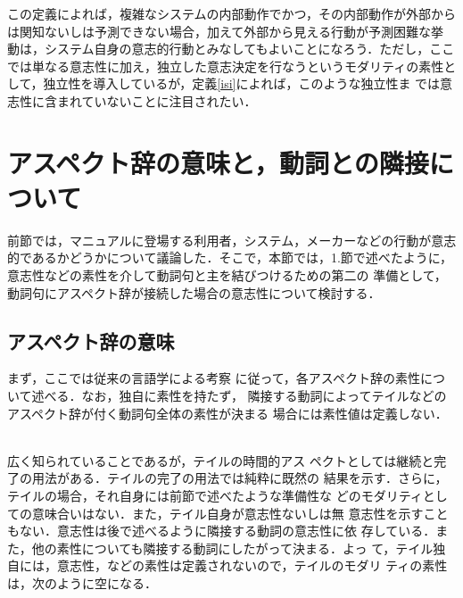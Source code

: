 この定義によれば，複雑なシステムの内部動作でかつ，その内部動作が外部から
は関知ないしは予測できない場合，加えて外部から見える行動が予測困難な挙
動は，システム自身の意志的行動とみなしてもよいことになろう．ただし，ここ
では単なる意志性に加え，独立した意志決定を行なうというモダリティの素性と
して，独立性を導入しているが，定義\ref{isi}によれば，このような独立性ま
では意志性に含まれていないことに注目されたい．


\section{アスペクト辞の意味と，動詞との隣接について}
\label{semcon}

前節では，マニュアルに登場する利用者，システム，メーカーなどの行動が意志
的であるかどうかについて議論した．そこで，本節では，1.節で述べたように，
意志性などの素性を介して動詞句と{\dg 主}を結びつけるための第二の
準備として，動詞句にアスペクト辞が接続した場合の意志性について検討する．

\subsection{アスペクト辞の意味}
\label{seman}

まず，ここでは従来の言語学による考察
\cite{寺村:日本語のシンタクスと意味2}
に従って，各アスペクト辞の素性について述べる．なお，独自に素性を持たず，
隣接する動詞によってテイルなどのアスペクト辞が付く動詞句全体の素性が決まる
場合には素性値は定義しない．

\\広く知られていることであるが，テイルの時間的アス
ペクトとしては継続と完了の用法がある．テイルの完了の用法では純粋に既然の
結果を示す．さらに，テイルの場合，それ自身には前節で述べたような準備性な
どのモダリティとしての意味合いはない．また，テイル自身が意志性ないしは無
意志性を示すこともない．意志性は後で述べるように隣接する動詞の意志性に依
存している．また，他の素性についても隣接する動詞にしたがって決まる．よっ
て，テイル独自には，意志性，などの素性は定義されないので，テイルのモダリ
ティの素性は，次のように空になる．


